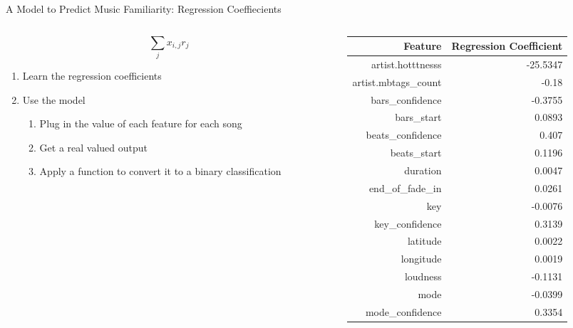 \documentclass[aspectratio=169]{beamer}
\begin{document}
\begin{frame}{A Model to Predict Music Familiarity: Regression Coeffiecients}

\begin{columns}
\begin{column}{0.4\textwidth}
	$$ \sum_j x_{i,j} r_j$$
\begin{enumerate}
\item Learn the regression coefficients
\item Use the model
\begin{enumerate}
\item Plug in the value of each feature for each song 
\item Get a real valued output
\item Apply a function to convert it to a binary classification
\end{enumerate}
\end{enumerate}
\end{column}
\begin{column}{0.6\textwidth}
{\tiny
\begin {table}[H]
\begin{tabular}{|r|r|}
\hline
Feature & Regression Coefficient \\ \hline
artist.hotttnesss      &      -25.5347\\ \hline
artist.mbtags\_count   &          -0.18\\ \hline
bars\_confidence    &           -0.3755\\ \hline
bars\_start              &       0.0893\\ \hline
beats\_confidence   &             0.407\\ \hline
beats\_start          &          0.1196\\ \hline
duration              &         0.0047\\ \hline
end\_of\_fade\_in      &           0.0261\\ \hline
key                     &      -0.0076\\ \hline
key\_confidence     &            0.3139\\ \hline
latitude               &        0.0022\\ \hline
longitude          &            0.0019\\ \hline
loudness         &             -0.1131\\ \hline
mode                 &         -0.0399\\ \hline
mode\_confidence &               0.3354\\ \hline

\end{tabular}
\end{table}}
\end{column}
\end{columns}
\end{frame}
\end{document}
